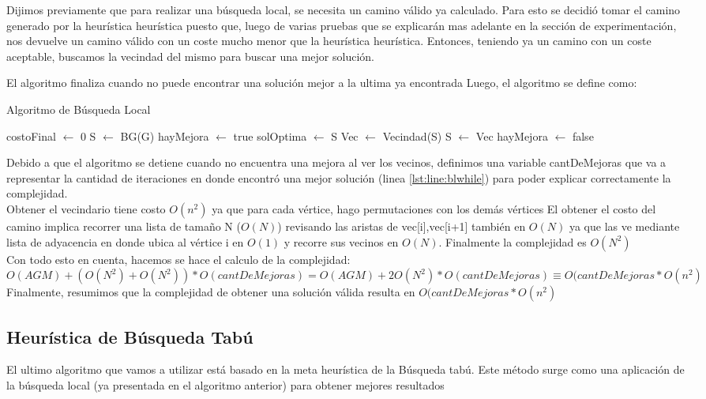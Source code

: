 \documentclass[10pt,a4paper]{article}
\begin{document}
Dijimos previamente que para realizar una búsqueda local, se necesita un camino válido ya calculado. Para esto se decidió tomar el camino generado por la heurística {heurística} puesto que, luego de varias pruebas que se explicarán mas adelante en la sección de experimentación, nos devuelve un camino válido con un coste mucho menor que la heurística {heurística}. Entonces, teniendo ya un camino con un coste aceptable, buscamos la vecindad del mismo para buscar una mejor solución.

El algoritmo finaliza cuando no puede encontrar una solución mejor a la ultima ya encontrada
Luego, el algoritmo se define como:

\begin{algorithm}[H] 
\caption{Algoritmo de Búsqueda Local}
\begin{algorithmic}[1]
\State costoFinal $\gets$ 0
    \State S $\gets$ BG(G)
    \State hayMejora $\gets$ true
    \State solOptima $\gets$ S
     \label{lst:line:blwhile}
        \State Vec $\gets$ Vecindad(S)
            S $\gets$ Vec
        \EndIf
            hayMejora $\gets$ false
        \EndIf
    \EndWhile
\EndFunction
\end{algorithmic}
\label{alg:BL}
\end{algorithm}

Debido a que el algoritmo se detiene cuando no encuentra una mejora al ver los vecinos, definimos una variable cantDeMejoras que va a representar la cantidad de iteraciones en donde encontró una mejor solución (linea \ref{lst:line:blwhile}) para poder explicar correctamente la complejidad. \\
Obtener el vecindario tiene costo $O(n^2)$ ya que para cada vértice, hago permutaciones con los demás vértices
El obtener el costo del camino implica recorrer una lista de tamaño N ($O(N)$) revisando las aristas de vec[i],vec[i+1] también en $O(N)$ ya que las ve mediante lista de adyacencia en donde ubica al vértice i en $O(1)$ y recorre sus vecinos en $O(N)$. Finalmente la complejidad es $O(N^2)$ \\
Con todo esto en cuenta, hacemos se hace el calculo de la complejidad:
$O(AGM) + (O(N^2) + O(N^2)) * O(cantDeMejoras) = O(AGM) + 2O(N^2)*O(cantDeMejoras) \equiv O(cantDeMejoras*O(n^2)$ 
Finalmente, resumimos que la complejidad de obtener una solución válida resulta en $O(cantDeMejoras*O(n^2)$ 

\subsection{Heurística de Búsqueda Tabú}
El ultimo algoritmo que vamos a utilizar está basado en la meta heurística de la Búsqueda tabú. Este método surge como una aplicación de la búsqueda local (ya presentada en el algoritmo anterior) para obtener mejores resultados
\end{document}
